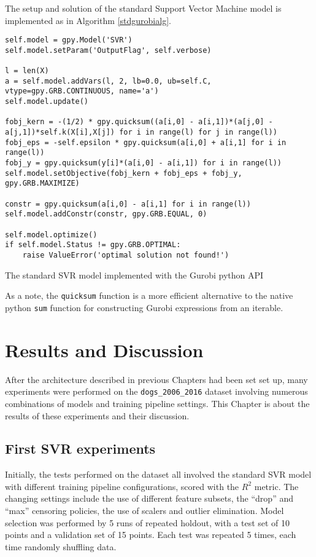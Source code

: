 \documentclass[12pt]{report}
\begin{document}
The setup and solution of the standard Support Vector Machine model is implemented as in Algorithm \ref{stdgurobialg}.
\begin{algorithm}[H]
\begin{lstlisting}
self.model = gpy.Model('SVR')
self.model.setParam('OutputFlag', self.verbose)

l = len(X)
a = self.model.addVars(l, 2, lb=0.0, ub=self.C, vtype=gpy.GRB.CONTINUOUS, name='a')
self.model.update()

fobj_kern = -(1/2) * gpy.quicksum((a[i,0] - a[i,1])*(a[j,0] - a[j,1])*self.k(X[i],X[j]) for i in range(l) for j in range(l))
fobj_eps = -self.epsilon * gpy.quicksum(a[i,0] + a[i,1] for i in range(l))
fobj_y = gpy.quicksum(y[i]*(a[i,0] - a[i,1]) for i in range(l))
self.model.setObjective(fobj_kern + fobj_eps + fobj_y, gpy.GRB.MAXIMIZE)

constr = gpy.quicksum(a[i,0] - a[i,1] for i in range(l))
self.model.addConstr(constr, gpy.GRB.EQUAL, 0)

self.model.optimize()
if self.model.Status != gpy.GRB.OPTIMAL:
	raise ValueError('optimal solution not found!')
\end{lstlisting}
\caption{The standard SVR model implemented with the Gurobi python API}
\label{stdgurobialg}
\end{algorithm}

As a note, the \texttt{quicksum} function is a more efficient alternative to the native python \texttt{sum} function for constructing Gurobi expressions from an iterable.

\chapter{Results and Discussion}
\label{chres}
After the architecture described in previous Chapters had been set set up, many experiments were performed on the \texttt{dogs\_2006\_2016} dataset involving numerous combinations of models and training pipeline settings. This Chapter is about the results of these experiments and their discussion.

\section{First SVR experiments}
Initially, the tests performed on the dataset all involved the standard SVR model with different training pipeline configurations, scored with the $R^2$ metric. The changing settings include the use of different feature subsets, the ``drop'' and ``max'' censoring policies, the use of scalers and outlier elimination. Model selection was performed by 5 runs of repeated holdout, with a test set of 10 points and a validation set of 15 points. Each test was repeated 5 times, each time randomly shuffling data.
\end{document}
